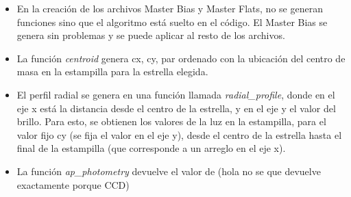 \documentclass[a4paper, 11pt, spanish]{article}
\begin{document}
\begin{itemize}
	\item En la creaci\'on de los archivos Master Bias y Master Flats, no se generan funciones sino que el algoritmo est\'a suelto en el c\'odigo. El Master Bias se genera sin problemas y se puede aplicar al resto de los archivos.
	\item La funci\'on \textit{centroid} genera cx, cy, par ordenado con la ubicaci\'on del centro de masa en la estampilla para la estrella elegida. 
	\item El perfil radial se genera en una funci\'on llamada \textit{radial\_profile}, donde en el eje x est\'a la distancia desde el centro de la estrella, y en el eje y el valor del brillo. Para esto, se obtienen los valores de la luz en la estampilla, para el valor fijo cy (se fija el valor en el eje y), desde el centro de la estrella hasta el final de la estampilla (que corresponde a un arreglo en el eje x). 
	\item La funci\'on \textit{ap\_photometry} devuelve el valor de (hola no se que devuelve exactamente porque CCD)
\end{itemize}
\end{document}

